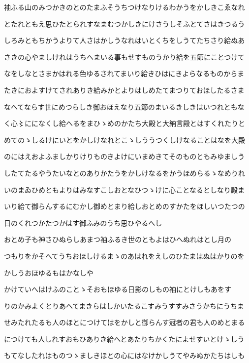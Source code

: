 \documentclass[a4paper,11pt,landscape]{ltjtarticle}
\begin{document}
袖ふる山のみつかきのとのたまふそうちつけなりけるわかうをかしきこゑなれ
\par\medskip
とたれともえ思ひたとられすなまむつかしきにけさうしそふとてさはきつるう
\par\medskip
しろみともちかうよりて人さはかしうなれはいとくちをしうてたちさり給ぬあ
\par\medskip
さきの心やましけれはうちへまいる事もせすものうかり給を五節にことつけて
\par\medskip
なをしなとさまかはれる色ゆるされてまいり給きひはにきよらなるものからま
\par\medskip
たきにおよすけてされありき給みかとよりはしめたてまつりておほしたるさま
\par\medskip
なへてならす世にめつらしき御おほえなり五節のまいるきしきはいつれともな
\par\medskip
く心〻にになくし給へるをまひゝめのかたち大殿と大納言殿とはすくれたりと
\par\medskip
めてのゝしるけにいとをかしけなれとこゝしううつくしけなることはなを大殿
\par\medskip
のにはえおよふましかりけりものきよけにいまめきてそのものともみゆましう
\par\medskip
したてたるやうたいなとのありかたうをかしけなるをかうほめらるゝなめりれ
\par\medskip
いのまゐひめともよりはみなすこしおとなひつゝけに心ことなるとしなり殿ま
\par\medskip
いり給て御らんするにむかし御めとまり給しおとめのすかたをほしいつたつの
\par\medskip
日のくれつかたつかはす御ふみのうち思ひやるへし
\par\medskip
おとめ子も神さひぬらしあまつ袖ふるき世のともよはひへぬれはとし月の
\par\medskip
つもりをかそへてうちおほしけるまゝのあはれをえしのひたまはぬはかりのを
\par\medskip
かしうおほゆるもはかなしや
\par\medskip
かけていへはけふのことゝそおもほゆる日影のしもの袖にとけしもあをす
\par\medskip
りのかみよくとりあへてまきらはしかいたるこすみうすすみさうかちにうちま
\par\medskip
せみたれたるも人のほとにつけてはをかしと御らんす冠者の君も人のめとまる
\par\medskip
につけても人しれすおもひありき給へとあたりちかくたによせすいとけゝしう
\par\medskip
もてなしたれはものつゝましきほとの心にはなけかしうてやみぬかたちはしも
\par\medskip
\end{document}
